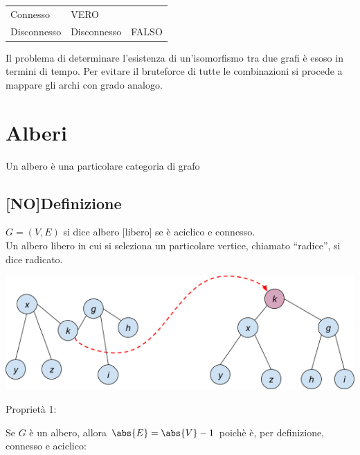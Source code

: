 \documentclass[11pt,a4paper,twoside,openright]{book}
\begin{document}
{{\begin{longtable}[]{@{}lll@{}}
\begin{minipage}[t]{0.30\columnwidth}
{Connesso}\strut
\end{minipage} & \begin{minipage}[t]{0.30\columnwidth}\raggedright\strut
{VERO}\strut
\end{minipage}\tabularnewline
\begin{minipage}[t]{0.30\columnwidth}\raggedright\strut
{Disconnesso}\strut
\end{minipage} & \begin{minipage}[t]{0.30\columnwidth}\raggedright\strut
{Disconnesso}\strut
\end{minipage} & \begin{minipage}[t]{0.30\columnwidth}\raggedright\strut
{FALSO}\strut
\end{minipage}\tabularnewline
\bottomrule
\end{longtable}

{Il problema di determinare l'esistenza di un'isomorfismo tra due grafi è esoso in termini di tempo. Per evitare il bruteforce di tutte le combinazioni si procede a mappare gli archi con grado analogo.}

\section{Alberi}

{Un albero è una particolare categoria di grafo}

\subsection{{[}NO{]}Definizione}

$G=(V,E)$ si dice albero {[}libero{]} se è aciclico e connesso.\\
Un albero libero in cui si seleziona un particolare vertice, chiamato ``radice'', si dice radicato.

{\includegraphics{images/image533.png}}

{Proprietà 1:}

Se $G$ è un albero, allora $\abs{E} = \abs{V} - 1$ poichè è, per definizione, connesso e aciclico:

}}
\end{document}
